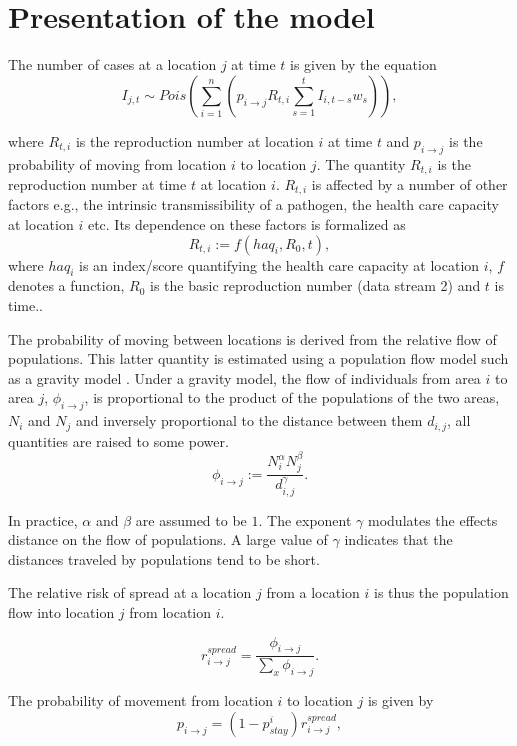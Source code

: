 \documentclass[11pt,]{article}
\begin{document}
\section{Presentation of the model}\label{sec:model}

The number of cases at a location \(j\) at time \(t\) is given by the equation
\[
  I_{j, t} \sim Pois\left( \sum_{i = 1}^{n} {\left( p_{i \rightarrow j}
  R_{t, i} \sum_{s = 1}^{t}{I_{i, t - s} w_{s}}\right)} \right),
\]

where \(R_{t, i}\) is the reproduction number at location \(i\) at time
\(t\) and \(p_{i \rightarrow j}\) is the probability of moving from
location \(i\) to location \(j\). The quantity $R_{t, i}$ is the
reproduction number at time $t$ at location $i$. $R_{t, i}$ is
affected by a number of other factors e.g., the intrinsic
transmissibility of a pathogen, the health care capacity at location
$i$ etc. Its dependence on these factors is formalized as
\[ R_{t, i} := f(haq_i, R_0, t),\]
where $haq_i$ is an index/score quantifying the health care capacity at location 
$i$, $f$ denotes a function, $R_0$ is the basic reproduction number (data stream 2) and $t$ is time..

The probability of moving between locations is derived from the
relative flow of populations.
This latter quantity is estimated using a population flow
model such as a gravity model \citep{GROSCHE2007175}. Under a gravity model, the flow of individuals from area \(i\) to area \(j\),
\(\phi_{i \rightarrow j}\), is proportional to the product of the
populations of the two areas, \(N_i\) and \(N_j\) and inversely
proportional to the distance between them \(d_{i, j}\), all quantities
are raised to some power.
\[
  \phi_{i \rightarrow j} :=  \frac{N_i^{\alpha}N_j^{\beta}}{d_{i, j}^{\gamma}}.
\]

In practice, \( \alpha \) and \( \beta \) are assumed to be $1$. The
exponent \( \gamma \) modulates the effects distance on the flow of
populations. A large value of \( \gamma \) indicates that the
distances traveled by populations tend to be short.

The relative risk of spread at a location \(j\) from a location \(i\)
is thus the population flow into location \(j\) from location \(i\).

\[
  r_{i \rightarrow j}^{spread} = \frac{\phi_{i \rightarrow
  j}}{\sum_{x}{\phi_{i \rightarrow
  j}}}.
\]

The probability of movement from location \(i\) to location \(j\) is given by
\[  p_{i \rightarrow j} = (1 - p_{stay}^i) r_{i \rightarrow j}^{spread},\]
\end{document}
